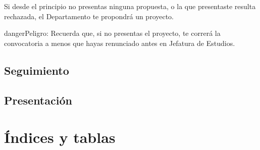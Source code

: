 \documentclass[a4paper,12pt,spanish]{sphinxmanual}
\begin{document}
Si desde el principio no presentas ninguna propuesta, o la que presentaste resulta rechazada, el Departamento te propondrá un proyecto.

\begin{sphinxadmonition}{danger}{Peligro:}
Recuerda que, si no presentas el proyecto, te correrá la convocatoria a menos que hayas renunciado antes en Jefatura de Estudios.
\end{sphinxadmonition}


\section{Seguimiento}
\label{\detokenize{fases-de-realizacion:seguimiento}}

\section{Presentación}
\label{\detokenize{fases-de-realizacion:presentacion}}

\chapter{Índices y tablas}
\label{\detokenize{index_latex:indices-y-tablas}}


\renewcommand{\indexname}{Índice}
\printindex
\end{document}
